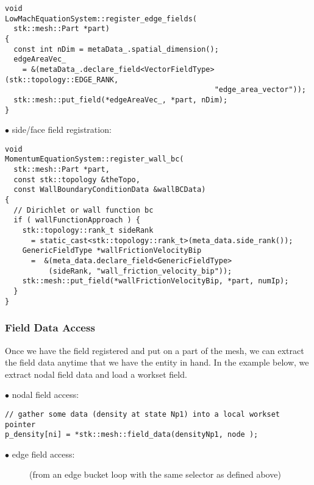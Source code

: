 \begin{lstlisting}
void
LowMachEquationSystem::register_edge_fields(
  stk::mesh::Part *part)
{
  const int nDim = metaData_.spatial_dimension();
  edgeAreaVec_ 
    = &(metaData_.declare_field<VectorFieldType>(stk::topology::EDGE_RANK, 
                                                "edge_area_vector"));
  stk::mesh::put_field(*edgeAreaVec_, *part, nDim);
}
\end{lstlisting}

\begin{description}
\item[$\bullet$ side/face field registration:]
\end{description}

\begin{lstlisting}
void
MomentumEquationSystem::register_wall_bc(
  stk::mesh::Part *part,
  const stk::topology &theTopo,
  const WallBoundaryConditionData &wallBCData)
{
  // Dirichlet or wall function bc
  if ( wallFunctionApproach ) {
    stk::topology::rank_t sideRank 
      = static_cast<stk::topology::rank_t>(meta_data.side_rank());
    GenericFieldType *wallFrictionVelocityBip 
      =  &(meta_data.declare_field<GenericFieldType>
          (sideRank, "wall_friction_velocity_bip"));
    stk::mesh::put_field(*wallFrictionVelocityBip, *part, numIp);
  }
}
\end{lstlisting}

\subsubsection{Field Data Access}
Once we have the field registered and put on a part of the mesh, we can extract the field
data anytime that we have the entity in hand. In the example below, we extract nodal field
data and load a workset field.

\begin{description}
\item[$\bullet$ nodal field access:]
\end{description}

\begin{lstlisting}
// gather some data (density at state Np1) into a local workset pointer
p_density[ni] = *stk::mesh::field_data(densityNp1, node );
\end{lstlisting}

\begin{description}
\item[$\bullet$ edge field access:] (from an edge bucket loop with the same selector as defined above)
\end{description}

